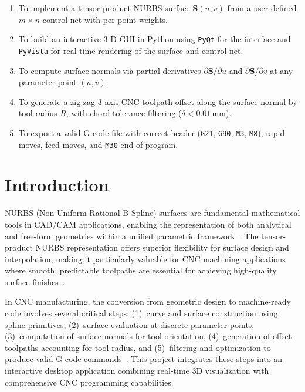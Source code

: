 \documentclass[a4paper,12pt]{article}
\begin{document}
\begin{enumerate}
    \item To implement a tensor-product NURBS surface $\mathbf{S}(u,v)$ from a
          user-defined $m \times n$ control net with per-point weights.
    \item To build an interactive 3-D GUI in Python using \texttt{PyQt} for the
          interface and \texttt{PyVista} for real-time rendering of the surface
          and control net.
    \item To compute surface normals via partial derivatives
          $\partial\mathbf{S}/\partial u$ and $\partial\mathbf{S}/\partial v$
          at any parameter point $(u,v)$.
    \item To generate a zig-zag 3-axis CNC toolpath offset along the surface
          normal by tool radius $R$, with chord-tolerance filtering
          ($\delta < 0.01$\,mm).
    \item To export a valid G-code file with correct header (\texttt{G21},
          \texttt{G90}, \texttt{M3}, \texttt{M8}), rapid moves, feed moves,
          and \texttt{M30} end-of-program.
\end{enumerate}

\section{Introduction}

NURBS (Non-Uniform Rational B-Spline) surfaces are fundamental mathematical
tools in CAD/CAM applications, enabling the representation of both analytical
and free-form geometries within a unified parametric framework~\cite{ref1}.
The tensor-product NURBS representation offers superior flexibility for
surface design and interpolation, making it particularly valuable for CNC
machining applications where smooth, predictable toolpaths are essential for
achieving high-quality surface finishes~\cite{ref2}.

In CNC manufacturing, the conversion from geometric design to machine-ready
code involves several critical steps: (1)~curve and surface construction using
spline primitives, (2)~surface evaluation at discrete parameter points,
(3)~computation of surface normals for tool orientation, (4)~generation of
offset toolpaths accounting for tool radius, and (5)~filtering and
optimization to produce valid G-code commands~\cite{ref3}. This project
integrates these steps into an interactive desktop application combining
real-time 3D visualization with comprehensive CNC programming capabilities.
\end{document}
